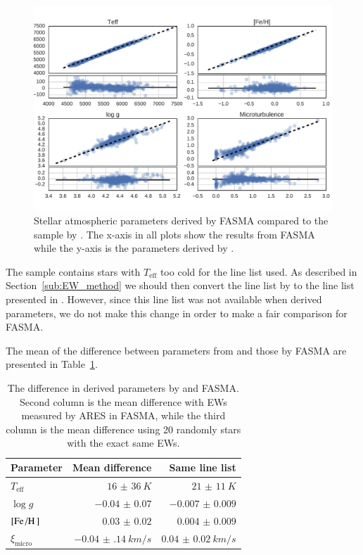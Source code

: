 \documentclass{aa}
\begin{document}
\begin{figure}[tpb]
    \centering
    \includegraphics[width=1.0\linewidth,natwidth=750,natheight=500]{figures/FASMATest.pdf}
    \caption{Stellar atmospheric parameters derived by FASMA compared
    to the sample by \citet{Sousa2011}. The x-axis in all plots show the results
    from FASMA while the y-axis is the parameters derived by \citet{Sousa2011}.}
    \label{fig:FASMATest}
\end{figure}

The sample contains stars with $T_\mathrm{eff}$ too cold for the line list used.
As described in Section~\ref{sub:EW_method} we should then convert the line list
by \citet{Sousa2008a} to the line list presented in \citet{Tsantaki2013}.
However, since this line list was not available when \citet{Sousa2011} derived
parameters, we do not make this change in order to make a fair comparison for
FASMA.

The mean of the difference between parameters from \citet{Sousa2011} and those
by FASMA are presented in Table~\ref{tab:FASMATest}.

\begin{table}[htb!]
    \caption{The difference in derived parameters by \citet{Sousa2011}
    and FASMA. Second column is the mean difference with EWs measured by
    ARES in FASMA, while the third column is the mean difference using
    20 randomly stars with the exact same EWs.}
    \label{tab:FASMATest}
    \centering
    \begin{tabular}{lrr}
      \hline\hline
      Parameter             &  Mean difference         & Same line list        \\
      \hline
      $T_\mathrm{eff}$      &  $\SI{16(36)}{K}$        & $\SI{21(11)}{K}$      \\
      $\log g$              &  $\num{-0.04(7)}$        & $\num{-0.007(9)}$     \\
      $[\ion{Fe}/\ion{H}]$  &  $\num{0.03(2)}$         & $\num{0.004(9)}$      \\
      $\xi_\mathrm{micro}$  &  $\SI{-0.04(14)}{km/s}$  & $\SI{0.04(2)}{km/s}$  \\
      \hline
    \end{tabular}
\end{table}
\end{document}
